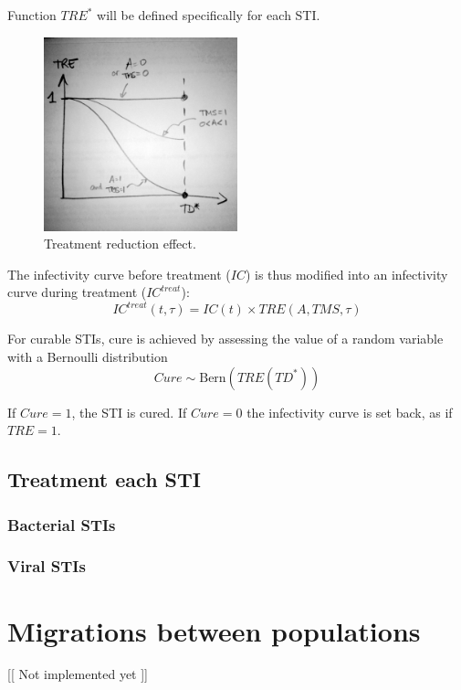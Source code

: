 \documentclass[11pt, onecolumn]{article}
\begin{document}
Function $TRE^*$ will be defined specifically for each STI.

\begin{figure}[!ht]
\centering
    \includegraphics[angle=0,width=0.5\textwidth]{TRE.JPG}
\caption{Treatment reduction effect.}
\label{fig:TRE}
\end{figure}

The infectivity curve before treatment ($IC$) is thus modified into an infectivity curve during treatment ($IC^{treat}$):
$$IC^{treat}(t,\tau)= IC(t)\times TRE(A,TMS,\tau)  $$

For curable STIs, cure is achieved by assessing the value of a random variable with a Bernoulli distribution 
$$Cure \sim \mathrm{Bern}(TRE(TD^*)) $$

If $Cure=1$, the STI is cured. If $Cure=0$ the infectivity curve is set back, as if $TRE=1$.

\subsection{Treatment each STI}

\subsubsection{Bacterial STIs}
\subsubsection{Viral STIs}






\section{Migrations between populations}
[[ Not implemented yet ]]
\end{document}
